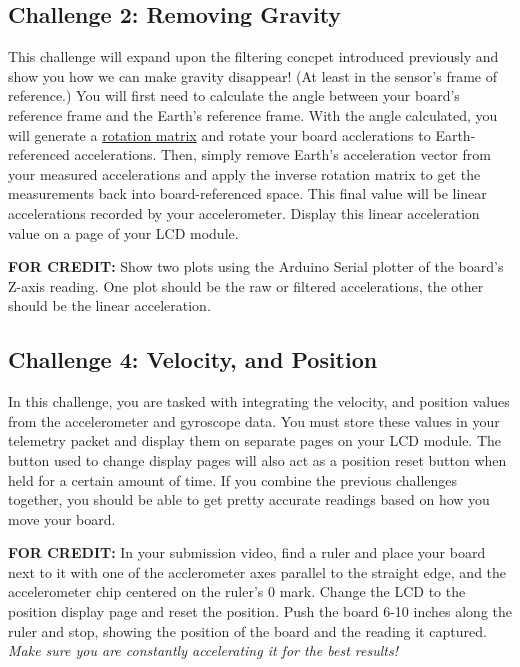     \subsection*{Challenge 2: Removing Gravity}
    This challenge will expand upon the filtering concpet introduced previously and show you how we can make gravity disappear! (At least in the sensor's frame of reference.)
    You will first need to calculate the angle between your board's reference frame and the Earth's reference frame.
    With the angle calculated, you will generate a \href{https://en.wikipedia.org/wiki/Rotation_matrix}{rotation matrix} and rotate your board acclerations to Earth-referenced accelerations.
    Then, simply remove Earth's acceleration vector from your measured accelerations and apply the inverse rotation matrix to get the measurements back into board-referenced space.
    This final value will be linear accelerations recorded by your accelerometer.
    Display this linear acceleration value on a page of your LCD module.

    \textbf{FOR CREDIT:} Show two plots using the Arduino Serial plotter of the board's Z-axis reading. 
    One plot should be the raw or filtered accelerations, the other should be the linear acceleration. 

    \subsection*{Challenge 4: Velocity, and Position}
    In this challenge, you are tasked with integrating the velocity, and position values from the accelerometer and gyroscope data.
    You must store these values in your telemetry packet and display them on separate pages on your LCD module.
    The button used to change display pages will also act as a position reset button when held for a certain amount of time.
    If you combine the previous challenges together, you should be able to get pretty accurate readings based on how you move your board.
    
    \textbf{FOR CREDIT:} In your submission video, find a ruler and place your board next to it with one of the acclerometer axes parallel to the straight edge, and the accelerometer chip centered on the ruler's 0 mark.
    Change the LCD to the position display page and reset the position.
    Push the board 6-10 inches along the ruler and stop, showing the position of the board and the reading it captured.
    \textit{Make sure you are constantly accelerating it for the best results!}
    
